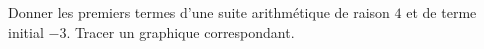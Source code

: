 
\begin{exercice}\label{exosmath-0164}

    Donner les premiers termes d'une suite arithmétique de raison \( 4\) et de terme initial \( -3\). Tracer un graphique correspondant.

\end{exercice}
